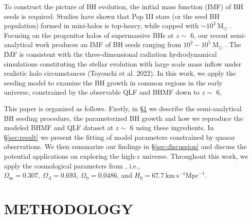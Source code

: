 \documentclass[twocolumn, twocolappendix]{aastex63}
\newcommand{\Msun}{\mathrm{M_\odot}}
\begin{document}
\begin{CJK*}{UTF8}{gbsn}
To construct the picture of BH evolution, the initial mass function (IMF) of BH seeds is required.
Studies have shown that Pop III stars (or the seed BH population) formed in mini-halos is top-heavy, while capped with $\sim 10^3~\Msun$ 
\citep{2014ApJ...781...60H,2015MNRAS.448..568H}.
Focusing on the progenitor halos of supermassive BHs at $z\sim$ 6, 
our recent semi-analytical work produces an IMF of BH seeds ranging from $10^2-10^5~\Msun$ \citep{2021ApJ...917...60L}. 
The IMF is consistent with the three-dimensional radiation hydrodynamical simulations 
constituting the stellar evolution with large scale mass inflow under realistic halo circumstances (Toyouchi et al. 2022).
In this work, we apply the seeding model to examine the BH growth in common regions in the early universe, 
constrained by the observable QLF and BHMF down to $z\sim$ 6, 

This paper is organized as follows. Firstly, in \S \ref{sec:method} we describe the semi-analytical BH seeding procedure, 
the parameterized BH growth and how we reproduce the modeled BHMF and QLF dataset at $z\sim$ 6 using these ingredients. 
In \S \ref{sec:result} we present the fitting of model parameters constrained by quasar observations. 
We then summarize our findings in \S \ref{sec:discussion} and discuss the potential applications on exploring the high-$z$ universe.
Throughout this work, we apply the cosmological parameters from \cite{2016A&A...594A..13P},
i.e., $\Omega_{\mathrm{m}}=0.307,~\Omega_{\Lambda}=0.693,~
\Omega_{\mathrm{b}}=0.0486$, and $H_0=67.7 \mathrm{~km} \mathrm{~s}^{-1} \mathrm{Mpc}^{-1}$.

\vspace{5mm}
\section{METHODOLOGY}\label{sec:method}

\vspace{2mm}

\end{CJK*}
\end{document}
